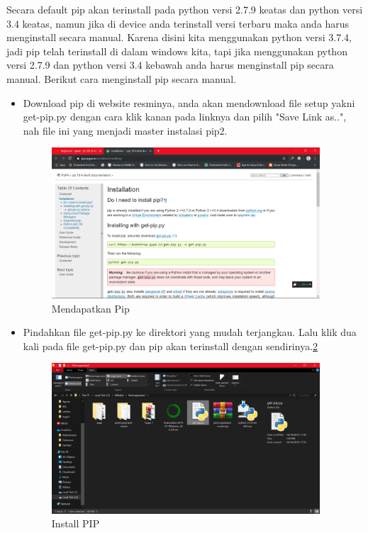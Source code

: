 \documentclass{article}
\begin{document}
Secara default pip akan terinstall pada python versi 2.7.9 keatas dan python versi 3.4 keatas, namun jika di device anda terinstall versi terbaru maka anda harus menginstall secara manual. Karena disini kita menggunakan python versi 3.7.4, jadi pip telah terinstall di dalam windows kita, tapi jika menggunakan python versi 2.7.9 dan python versi 3.4 kebawah anda harus menginstall pip secara manual. Berikut cara menginstall pip secara manual.

\begin{itemize}
\item Download pip di website resminya, anda akan mendownload file setup yakni get-pip.py dengan cara klik kanan pada linknya dan pilih "Save Link as..", nah file ini yang menjadi master instalasi pip2.
\begin{figure}[!htbp]
	\centering
	\includegraphics[width=10cm]{figures/getpip.png}
	\caption{Mendapatkan Pip}
	\label{getpip.png}
\end{figure}
\item Pindahkan file get-pip.py ke direktori yang mudah terjangkau. Lalu klik dua kali pada file get-pip.py dan pip akan terinstall dengan sendirinya.\ref{inspip.png}
\begin{figure}[!htbp]
	\centering
	\includegraphics[width=10cm]{figures/inspip.png}
	\caption{Install PIP}
	\label{inspip.png}
\end{figure}
\end{itemize}
\end{document}
